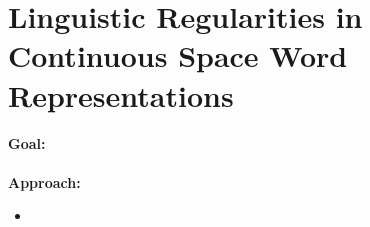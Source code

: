 \documentclass[11pt,a4paper]{article}
\begin{document}



\section{Linguistic Regularities in Continuous Space Word Representations} %
\label{sec:linguistic_regularities_in_continuous_space_word_representations}


  \textbf{Goal:}\\
  \\

  \textbf{Approach:}
  \begin{itemize}
    \item 
    
  \end{itemize}






\newpage



\end{document}
